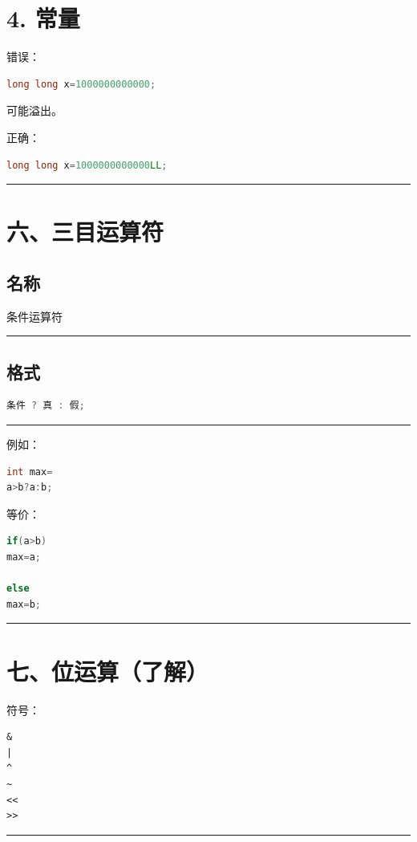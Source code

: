 \documentclass[9pt,twocolumn]{extarticle}
\begin{document}
\section{4. 常量}
错误：
\begin{lstlisting}[language=C++]
long long x=1000000000000;
\end{lstlisting}
可能溢出。

正确：
\begin{lstlisting}[language=C++]
long long x=1000000000000LL;
\end{lstlisting}

\noindent\rule{\linewidth}{0.4pt}

\section{六、三目运算符}

\subsection{名称}
条件运算符

\noindent\rule{\linewidth}{0.4pt}

\subsection{格式}
\begin{lstlisting}[language=C++]
条件 ? 真 : 假;
\end{lstlisting}

\noindent\rule{\linewidth}{0.4pt}

例如：
\begin{lstlisting}[language=C++]
int max=
a>b?a:b;
\end{lstlisting}
等价：
\begin{lstlisting}[language=C++]
if(a>b)
max=a;

else
max=b;
\end{lstlisting}

\noindent\rule{\linewidth}{0.4pt}

\section{七、位运算（了解）}

符号：
\begin{lstlisting}
&
|
^
~
<<
>>
\end{lstlisting}

\noindent\rule{\linewidth}{0.4pt}
\end{document}
